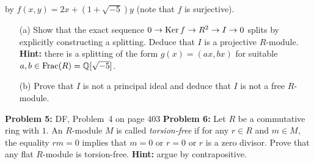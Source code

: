 \documentclass[12pt]{article}
\begin{document}
by $f(x,y)=2x+(1+\sqrt{-5})y$ (note that $f$ is surjective).
\begin{itemize}
\item[(a)] Show that the exact sequence $0\to{\rm Ker\,} f\to R^2\to I\to 0$ splits by explicitly constructing a splitting. Deduce that $I$ is a projective $R$-module. {\bf Hint:} there is a splitting of the form $g(x)=(ax,bx)$ for suitable
$a,b\in \mathrm{Frac}(R)={\mathbb Q}[\sqrt{-5}]$.
\item[(b)] Prove that $I$ is not a principal ideal and deduce that $I$ is not a free $R$-module.
\end{itemize}
\skv
{\bf Problem 5:} DF, Problem~4 on page 403
\skv
{\bf Problem 6:} Let $R$ be a commutative ring with $1$. An $R$-module $M$ is called {\it torsion-free} if for any $r\in R$
and $m\in M$, the equality $rm=0$ implies that $m=0$ or $r=0$ or $r$ is a zero divisor. Prove that any flat $R$-module is torsion-free. {\bf Hint:} argue by contrapositive.
\skv
\end{document}
